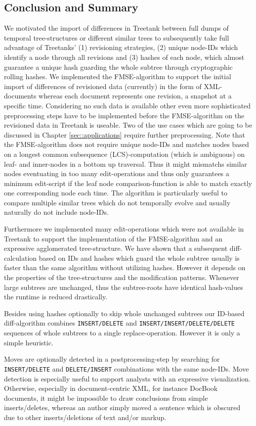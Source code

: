 \subsection{Conclusion and Summary}
We motivated the import of differences in Treetank between full dumps of temporal tree-structures or different similar trees to subsequently take full advantage of Treetanks' (1) revisioning strategies, (2) unique node-IDs which identify a node through all revisions and (3) hashes of each node, which almost guarantee a unique hash guarding the whole subtree through cryptographic rolling hashes. We implemented the FMSE-algorithm to support the initial import of differences of revisioned data (currently) in the form of XML-documents whereas each document represents one revision, a snapshot at a specific time. Considering no such data is available other even more sophisticated preprocessing steps have to be implemented before the FMSE-algorithm on the revisioned data in Treetank is useable. Two of the use cases which are going to be discussed in Chapter \ref{sec::applications} require further preprocessing. Note that the FMSE-algorithm does not require unique node-IDs and matches nodes based on a longest common subsequence (LCS)-computation (which is ambiguous) on leaf- and inner-nodes in a bottom up traversal. Thus it might mismatchs similar nodes eventuating in too many edit-operations and thus only guarantees a minimum edit-script if the leaf node comparison-function is able to match exactly one corresponding node each time. The algorithm is particularly useful to compare multiple similar trees which do not temporally evolve and usually naturally do not include node-IDs.

Furthermore we implemented many edit-operations which were not available in Treetank to support the implementation of the FMSE-algorithm and an expressive agglomerated tree-structure. We have shown that a subsequent diff-calculation based on IDs and hashes which guard the whole subtree usually is faster than the same algorithm without utilizing hashes. However it depends on the properties of the tree-structures and the modification patterns. Whenever large subtrees are unchanged, thus the subtree-roots have identical hash-values the runtime is reduced drastically.

Besides using hashes optionally to skip whole unchanged subtrees our ID-based diff-algorithm combines \texttt{INSERT/DELETE} and \texttt{INSERT/INSERT/DELETE/DELETE} sequences of whole subtrees to a single replace-operation. However it is only a simple heuristic.

Moves are optionally detected in a postprocessing-step by searching for \texttt{INSERT/DELETE} and \texttt{DELETE/INSERT} combinations with the same node-IDs. Move detection is especially useful to support analysts with an expressive visualization. Otherwise, especially in document-centric XML, for instance DocBook\cite{docbook} documents, it might be impossible to draw conclusions from simple inserts/deletes, whereas an author simply moved a sentence which is obscured due to other inserts/deletions of text and/or markup.
